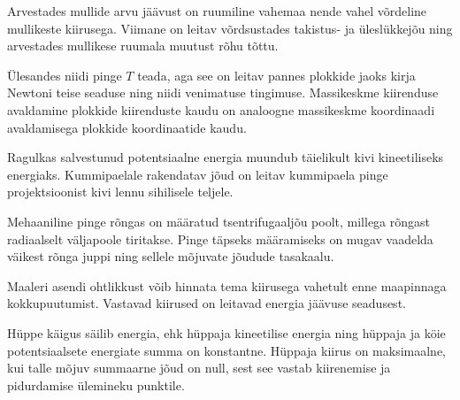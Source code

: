 \documentclass[10pt, twoside]{article}
\begin{document}
{
\hint
Arvestades mullide arvu jäävust on ruumiline vahemaa nende vahel võrdeline mullikeste kiirusega. Viimane on leitav võrdsustades takistus- ja üleslükkejõu ning arvestades mullikese ruumala muutust rõhu tõttu.
\probend
\bigskip


\hint
Ülesandes niidi pinge $T$ teada, aga see on leitav pannes plokkide jaoks kirja Newtoni teise seaduse ning niidi venimatuse tingimuse. Massikeskme kiirenduse avaldamine plokkide kiirenduste kaudu on analoogne massikeskme koordinaadi avaldamisega plokkide koordinaatide kaudu.
\probend
\bigskip


\hint
Ragulkas salvestunud potentsiaalne energia muundub täielikult kivi kineetiliseks energiaks. Kummipaelale rakendatav jõud on leitav kummipaela pinge projektsioonist kivi lennu sihilisele teljele.
\probend
\bigskip


\hint
Mehaaniline pinge rõngas on määratud tsentrifugaaljõu poolt, millega rõngast radiaalselt väljapoole tiritakse. Pinge täpseks määramiseks on mugav vaadelda väikest rõnga juppi ning sellele mõjuvate jõudude tasakaalu.
\probend
\bigskip


\hint
Maaleri asendi ohtlikkust võib hinnata tema kiirusega vahetult enne maapinnaga kokkupuutumist. Vastavad kiirused on leitavad energia jäävuse seadusest.
\probend
\bigskip


\hint
Hüppe käigus säilib energia, ehk hüppaja kineetilise energia ning hüppaja ja köie potentsiaalsete energiate summa on konstantne. Hüppaja kiirus on maksimaalne, kui talle mõjuv summaarne jõud on null, sest see vastab kiirenemise ja pidurdamise ülemineku punktile.
\probend
\bigskip

}
\end{document}

